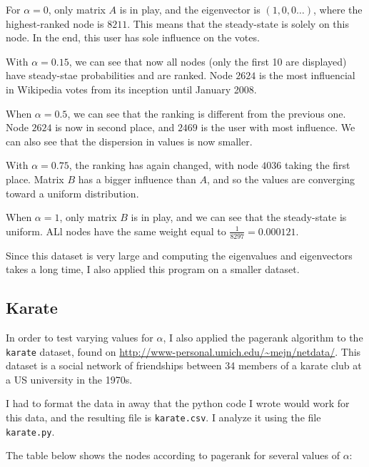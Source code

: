 \documentclass[]{article}
\begin{document}
For $\alpha = 0$, only matrix $A$ is in play, and the eigenvector is $(1, 0, 0 \ldots)$, where the highest-ranked node is $8211$. This means that the steady-state is solely on this node. In the end, this user has sole influence on the votes.

With $\alpha = 0.15$, we can see that now all nodes (only the first 10 are displayed) have steady-stae probabilities and are ranked. Node $2624$ is the most influencial in Wikipedia votes from its inception until January 2008.

When $\alpha = 0.5$, we can see that the ranking is different from the previous one. Node $2624$ is now in second place, and $2469$ is the user with most influence. We can also see that the dispersion in values is now smaller.

With $\alpha = 0.75$, the ranking has again changed, with node $4036$ taking the first place. Matrix $B$ has a bigger influence than $A$, and so the values are converging toward a uniform distribution.

When $\alpha = 1$, only matrix $B$ is in play, and we can see that the steady-state is uniform. ALl nodes have the same weight equal to $\frac{1}{8297} = 0.000121$.


Since this dataset is very large and computing the eigenvalues and eigenvectors takes a long time, I also applied this program on a smaller dataset.

\subsection*{Karate}
In order to test varying values for $\alpha$, I also applied the pagerank algorithm to the \texttt{karate} dataset, found on \url{http://www-personal.umich.edu/~mejn/netdata/}. This dataset is a social network of friendships between 34 members of a karate club at a US university in the 1970s.

I had to format the data in away that the python code I wrote would work for this data, and the resulting file is \texttt{karate.csv}. I analyze it using the file \texttt{karate.py}.

The table below shows the nodes according to pagerank for several values of $\alpha$: 
\end{document}
